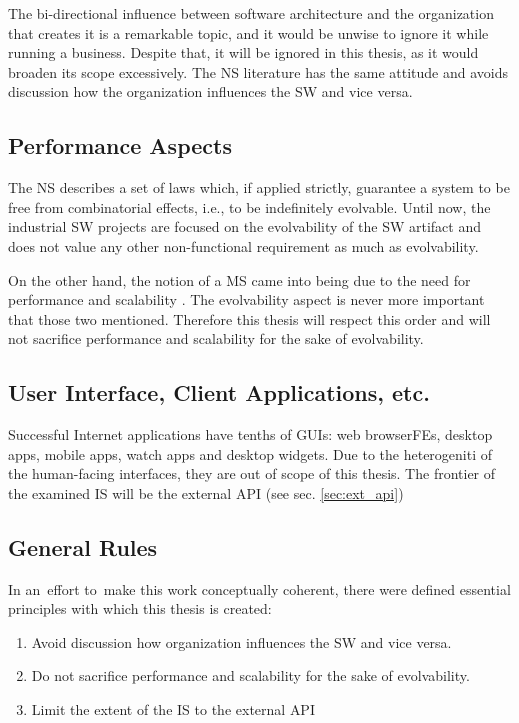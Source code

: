 \documentclass[thesis=M,english,hidelinks]{FITthesis}[2012/10/20]
\begin{document}
The bi-directional influence between software architecture and the organization that creates it is a remarkable topic, and it would be unwise to ignore it while running a business. Despite that, it will be ignored in this thesis, as it would broaden its scope excessively. The \acrshort{NS} literature \cite{ns-recreating, ns-toward-general-theory} has the same attitude and avoids discussion how the organization influences the \acrfull{SW} and vice versa.

\subsection{Performance Aspects}
The \acrlong{NS} describes a set of laws which, if applied strictly, guarantee a system to be free from combinatorial effects, i.e., to be indefinitely evolvable. Until now, the industrial \acrlong{SW} projects \cite{ns-it-isnt-different, ns-exploring-defence} are focused on the evolvability of the \acrshort{SW} artifact and does not value any other non-functional requirement as much as evolvability.

On the other hand, the notion of a \acrfull{MS} came into being due to the need for performance and scalability \cite{ms-building-ms, ms-evolutionary-arch}. The evolvability aspect is never more important that those two mentioned. Therefore this thesis will respect this order and will not sacrifice performance and scalability for the sake of evolvability.

\subsection{User Interface, Client Applications, etc. }
Successful Internet applications have tenths of \acrshort{GUI}s: web browser\acrshort{FE}s, desktop apps, mobile apps, watch apps and desktop widgets. Due to the heterogeniti of the human-facing interfaces, they are out of scope of this thesis. The frontier of the examined \acrfull{IS} will be the external \acrfull{API} (see sec. \ref{sec:ext_api})

\subsection{General Rules}
In an~effort to~make this work conceptually coherent, there were defined essential principles with which this thesis is created:
\begin{enumerate}
    \item Avoid discussion how organization influences the \acrshort{SW} and vice versa.
    \item Do not sacrifice performance and scalability for the sake of evolvability.
    \item Limit the extent of the \acrshort{IS} to the external \acrshort{API} 
\end{enumerate}
\end{document}
